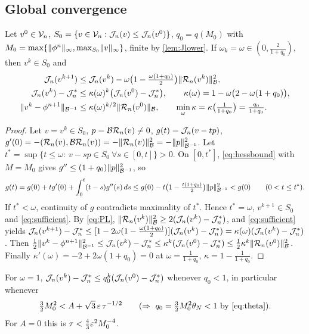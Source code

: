 \subsection{Global convergence}
\begin{theorem}\label{thm:global}
Let $v^0\in\mathcal{V}_n$, $S_0=\{v\in\mathcal{V}_n:\mathcal{J}_n(v)\le\mathcal{J}_n(v^0)\}$, $q_0=q(M_0)$ with $M_0=\max\{\lVert \phi^n\rVert_\infty,\max_{S_0}\lVert v\rVert_\infty\}$, finite by \cref{lem:Jlower}. If $\omega_k=\omega\in(0,\frac2{1+q_0})$, then $v^k\in S_0$ and
\begin{align}
\mathcal{J}_n(v^{k+1})&\le\mathcal{J}_n(v^k)-\omega\big(1-\tfrac{\omega(1+q_0)}2\big)\lVert \mathcal{R}_n(v^k)\rVert_{\mathcal{B}}^2,\label{eq:sufficient}\\
\mathcal{J}_n(v^k)-\mathcal{J}_n^*&\le\kappa(\omega)^k\big(\mathcal{J}_n(v^0)-\mathcal{J}_n^*\big),\qquad \kappa(\omega)=1-\omega\big(2-\omega(1+q_0)\big),\label{eq:Jrate}\\
\lVert v^k-\phi^{n+1}\rVert_{\mathcal{B}^{-1}}&\le\kappa(\omega)^{k/2}\lVert \mathcal{R}_n(v^0)\rVert_{\mathcal{B}},\qquad \min_\omega\kappa=\kappa\big(\tfrac1{1+q_0}\big)=\tfrac{q_0}{1+q_0}.\label{eq:errrate}
\end{align}
\end{theorem}

\begin{proof}
Let $v=v^k\in S_0$, $p=\mathcal{B}\mathcal{R}_n(v)\ne0$, $g(t)=\mathcal{J}_n(v-tp)$, $g'(0)=-(\mathcal{R}_n(v),\mathcal{B}\mathcal{R}_n(v))=-\lVert \mathcal{R}_n(v)\rVert_{\mathcal{B}}^2=-\lVert p\rVert_{\mathcal{B}^{-1}}^2$. Let $t^*=\sup\{t\le\omega:\ v-sp\in S_0\ \forall s\in[0,t]\}>0$. On $[0,t^*]$, \eqref{eq:hessbound} with $M=M_0$ gives $g''\le(1+q_0)\lVert p\rVert_{\mathcal{B}^{-1}}^2$, so
\[
g(t)=g(0)+tg'(0)+\int_0^t(t-s)g''(s)\,ds\le g(0)-t\big(1-\tfrac{t(1+q_0)}2\big)\lVert p\rVert_{\mathcal{B}^{-1}}^2<g(0)\qquad(0<t\le t^*).
\]
If $t^*<\omega$, continuity of $g$ contradicts maximality of $t^*$. Hence $t^*=\omega$, $v^{k+1}\in S_0$ and \eqref{eq:sufficient}. By \eqref{eq:PL}, $\lVert \mathcal{R}_n(v^k)\rVert_{\mathcal{B}}^2\ge2(\mathcal{J}_n(v^k)-\mathcal{J}_n^*)$, and \eqref{eq:sufficient} yields $\mathcal{J}_n(v^{k+1})-\mathcal{J}_n^*\le[1-2\omega(1-\frac{\omega(1+q_0)}2)](\mathcal{J}_n(v^k)-\mathcal{J}_n^*)=\kappa(\omega)(\mathcal{J}_n(v^k)-\mathcal{J}_n^*)$. Then $\frac12\lVert v^k-\phi^{n+1}\rVert_{\mathcal{B}^{-1}}^2\le\mathcal{J}_n(v^k)-\mathcal{J}_n^*\le\kappa^k(\mathcal{J}_n(v^0)-\mathcal{J}_n^*)\le\frac12\kappa^k\lVert \mathcal{R}_n(v^0)\rVert_{\mathcal{B}}^2$. Finally $\kappa'(\omega)=-2+2\omega(1+q_0)=0$ at $\omega=\frac1{1+q_0}$, $\kappa=1-\frac1{1+q_0}$.
\end{proof}

\begin{corollary}\label{cor:linear}
For $\omega=1$, $\mathcal{J}_n(v^k)-\mathcal{J}_n^*\le q_0^k(\mathcal{J}_n(v^0)-\mathcal{J}_n^*)$ whenever $q_0<1$, in particular whenever
\begin{equation}\label{eq:linear-condition}
\tfrac32M_0^2<A+\sqrt3\,\eps\,\tau^{-1/2}\qquad(\Rightarrow\ q_0=\tfrac32M_0^2\theta_N<1\text{ by \eqref{eq:theta}}).
\end{equation}
For $A=0$ this is $\tau<\frac43\varepsilon^2M_0^{-4}$.
\end{corollary}

